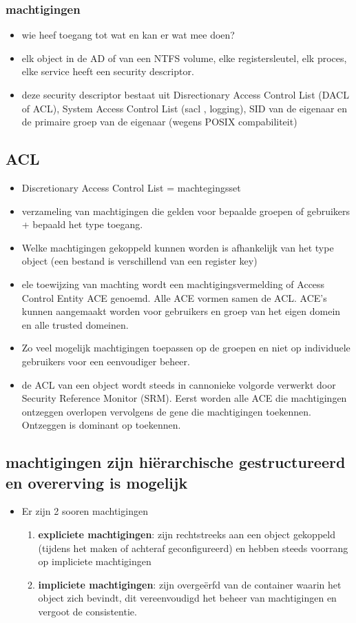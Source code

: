 \subsubsection{machtigingen}
\begin{itemize}
\item wie heef toegang tot wat en kan er wat mee doen?
\item elk object in de AD of van een NTFS volume, elke registersleutel, elk proces, elke service heeft een security descriptor.
\item deze security descriptor bestaat uit Disrectionary Access Control List (DACL of ACL), System Access Control List (sacl , logging), SID van de eigenaar en de primaire groep van de eigenaar (wegens POSIX compabiliteit)
\end{itemize}

\subsection{ACL}
\begin{itemize}
\item Discretionary Access Control List = machtegingsset
\item verzameling van machtigingen die gelden voor bepaalde groepen of gebruikers + bepaald het type toegang. 
\item Welke machtigingen gekoppeld kunnen worden is afhankelijk van het type object (een bestand is verschillend  van een register key)
\item ele toewijzing van machting wordt een machtigingsvermelding of Access Control Entity ACE genoemd. Alle ACE vormen samen de ACL. ACE's kunnen aangemaakt worden voor gebruikers en groep van het eigen domein en alle trusted domeinen.
\item Zo veel mogelijk machtigingen toepassen op de groepen en niet op individuele gebruikers voor een eenvoudiger beheer.
\item de ACL van een object wordt steeds in cannonieke volgorde verwerkt door Security Reference Monitor (SRM). Eerst worden alle ACE die machtigingen ontzeggen overlopen vervolgens de gene die machtigingen toekennen. Ontzeggen is dominant op toekennen.
\end{itemize}

\subsection{machtigingen zijn hi\"erarchische gestructureerd en overerving is mogelijk}
\begin{itemize}
\item Er zijn 2 sooren machtigingen
\begin{enumerate}
\item \textbf{expliciete machtigingen}: zijn rechtstreeks aan een object gekoppeld (tijdens het maken of achteraf geconfigureerd) en hebben steeds voorrang op impliciete machtigingen
\item \textbf{impliciete machtigingen}: zijn overge\"erfd van de container waarin het object zich bevindt, dit vereenvoudigd het beheer van machtigingen en vergoot de consistentie.
\end{enumerate}
\end{itemize}


